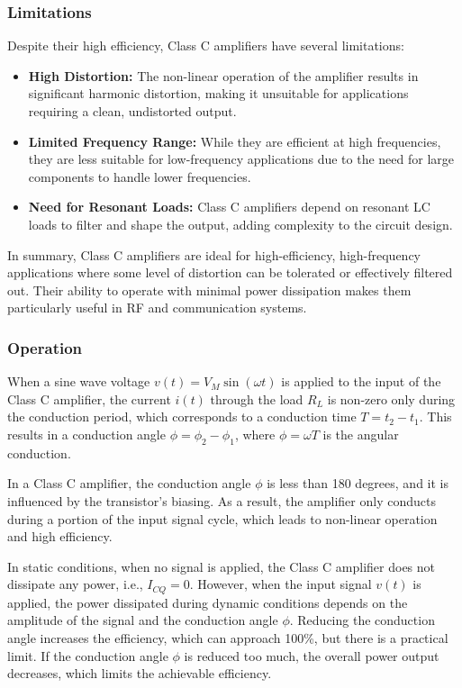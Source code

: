 \documentclass[12pt,a4paper]{article}
\begin{document}
    \subsubsection{Limitations}
    Despite their high efficiency, Class C amplifiers have several limitations:
    \begin{itemize}
        \item \textbf{High Distortion:} The non-linear operation of the amplifier results in significant harmonic distortion, making it unsuitable for applications requiring a clean, undistorted output.
        \item \textbf{Limited Frequency Range:} While they are efficient at high frequencies, they are less suitable for low-frequency applications due to the need for large components to handle lower frequencies.
        \item \textbf{Need for Resonant Loads:} Class C amplifiers depend on resonant LC loads to filter and shape the output, adding complexity to the circuit design.
    \end{itemize}

    In summary, Class C amplifiers are ideal for high-efficiency, high-frequency applications where some level of distortion can be tolerated or effectively filtered out. Their ability to operate with minimal power dissipation makes them particularly useful in RF and communication systems.


    \subsubsection{Operation}

When a sine wave voltage \( v(t) = V_M \sin(\omega t) \) is applied to the input of the Class C amplifier, the current \( i(t) \) through the load \( R_L \) is non-zero only during the conduction period, which corresponds to a conduction time \( T = t_2 - t_1 \). This results in a conduction angle \( \phi = \phi_2 - \phi_1 \), where \( \phi = \omega T \) is the angular conduction.

In a Class C amplifier, the conduction angle \( \phi \) is less than 180 degrees, and it is influenced by the transistor’s biasing. As a result, the amplifier only conducts during a portion of the input signal cycle, which leads to non-linear operation and high efficiency.

In static conditions, when no signal is applied, the Class C amplifier does not dissipate any power, i.e., \( I_{CQ} = 0 \). However, when the input signal \( v(t) \) is applied, the power dissipated during dynamic conditions depends on the amplitude of the signal and the conduction angle \( \phi \). Reducing the conduction angle increases the efficiency, which can approach 100\%, but there is a practical limit. If the conduction angle \( \phi \) is reduced too much, the overall power output decreases, which limits the achievable efficiency.
\end{document}
